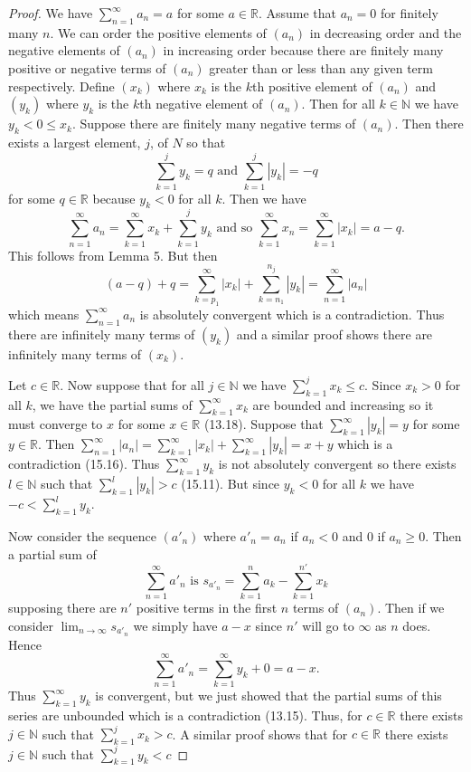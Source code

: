 \documentclass{article}
\begin{document}
\begin{flushleft}
\begin{proof}
We have $\sum_{n=1}^{\infty} a_n = a$ for some $a \in \mathbb{R}$. Assume that $a_n = 0$ for finitely many $n$. We can order the positive elements of $(a_n)$ in decreasing order and the negative elements of $(a_n)$ in increasing order because there are finitely many positive or negative terms of $(a_n)$ greater than or less than any given term respectively. Define $(x_k)$ where $x_k$ is the $k$th positive element of $(a_n)$ and $(y_k)$ where $y_k$ is the $k$th negative element of $(a_n)$. Then for all $k \in \mathbb{N}$ we have $y_k < 0 \leq x_k$. Suppose there are finitely many negative terms of $(a_n)$. Then there exists a largest element, $j$, of $N$ so that
\[
\sum_{k=1}^{j} y_k = q \text{ and } \sum_{k=1}^{j} |y_k| = -q
\]
for some $q \in \mathbb{R}$ because $y_k < 0$ for all $k$. Then we have
\[
\sum_{n=1}^{\infty} a_n = \sum_{k=1}^{\infty} x_k + \sum_{k=1}^{j} y_k \text{ and so } \sum_{k=1}^{\infty} x_n = \sum_{k=1}^{\infty} |x_k| = a-q.
\]
This follows from Lemma 5. But then
\[
(a-q)+q = \sum_{k=p_1}^{\infty} |x_k| + \sum_{k=n_1}^{n_j} |y_k| = \sum_{n=1}^{\infty} |a_n|
\]
which means $\sum_{n=1}^{\infty} a_n$ is absolutely convergent which is a contradiction. Thus there are infinitely many terms of $(y_k)$ and a similar proof shows there are infinitely many terms of $(x_k)$.\newline

Let $c \in \mathbb{R}$. Now suppose that for all $j \in \mathbb{N}$ we have $\sum_{k=1}^{j} x_k \leq c$. Since $x_k > 0$ for all $k$, we have the partial sums of $\sum_{k=1}^{\infty} x_k$ are bounded and increasing so it must converge to $x$ for some $x \in \mathbb{R}$ (13.18). Suppose that $\sum_{k=1}^{\infty} |y_k| = y$ for some $y \in \mathbb{R}$. Then $\sum_{n=1}^{\infty} |a_n| = \sum_{k=1}^{\infty} |x_k| + \sum_{k=1}^{\infty} |y_k| = x+y$ which is a contradiction (15.16). Thus $\sum_{k=1}^{\infty} y_k$ is not absolutely convergent so there exists $l \in \mathbb{N}$ such that $\sum_{k=1}^{l} |y_k| > c$ (15.11). But since $y_k < 0$ for all $k$ we have $-c < \sum_{k=1}^{l} y_k$.\newline

Now consider the sequence $(a'_n)$ where $a'_n = a_n$ if $a_n < 0$ and $0$ if $a_n \geq 0$. Then a partial sum of
\[
\sum_{n=1}^{\infty} a'_n \text{ is } s_{a'_n} = \sum_{k=1}^{n} a_k - \sum_{k=1}^{n'} x_k
\]
supposing there are $n'$ positive terms in the first $n$ terms of $(a_n)$. Then if we consider $\lim_{n \rightarrow \infty} s_{a'_n}$ we simply have $a-x$ since $n'$ will go to $\infty$ as $n$ does. Hence
\[
\sum_{n=1}^{\infty} a'_n = \sum_{k=1}^{\infty} y_k + 0 = a-x.
\]
Thus $\sum_{k=1}^{\infty} y_k$ is convergent, but we just showed that the partial sums of this series are unbounded which is a contradiction (13.15). Thus, for $c \in \mathbb{R}$ there exists $j \in \mathbb{N}$ such that $\sum_{k=1}^{j} x_k > c$. A similar proof shows that for $c \in \mathbb{R}$ there exists $j \in \mathbb{N}$ such that $\sum_{k=1}^{j} y_k < c$\newline


\end{proof}
\end{flushleft}
\end{document}
